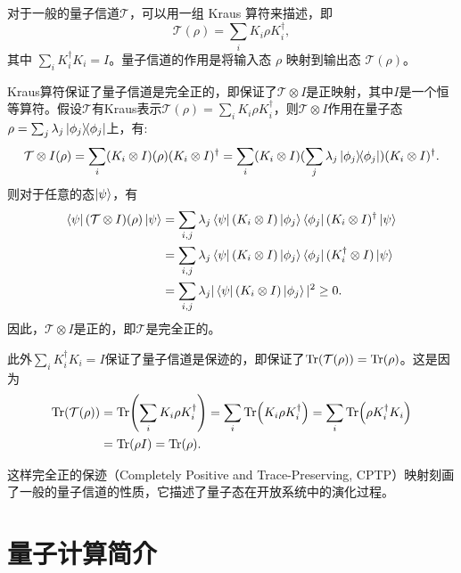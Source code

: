 对于一般的量子信道$\mathcal{T}$，可以用一组 Kraus 算符来描述，即
\begin{equation}
    \mathcal{T}(\rho) = \sum_i K_i \rho K_i^\dagger,
\end{equation}
其中 $\sum_i K_i^\dagger K_i = I$。量子信道的作用是将输入态 $\rho$ 映射到输出态 $\mathcal{T}(\rho)$。

Kraus算符保证了量子信道是完全正的，即保证了$\mathcal{T}\otimes I$是正映射，其中$I$是一个恒等算符。假设$\mathcal{T}$有Kraus表示$\mathcal{T}(\rho) = \sum_i K_i \rho K_i^\dagger$，则$\mathcal{T}\otimes I$作用在量子态$\rho=\sum_j \lambda_j \ketbra{\phi_j}$上，有:
\begin{equation}
        \mathcal{T}\otimes I(\rho) = \sum_i (K_i \otimes I)(\rho)(K_i \otimes I)^\dagger = \sum_i (K_i \otimes I)(\sum_j \lambda_j \ketbra{\phi_j})(K_i \otimes I)^\dagger.
\end{equation}
则对于任意的态$\ket{\psi}$，有
\begin{equation}
    \begin{aligned}
        \bra{\psi}(\mathcal{T}\otimes I)(\rho)\ket{\psi} &= \sum_{i,j} \lambda_j \bra{\psi}(K_i \otimes I)\ket{\phi_j}\bra{\phi_j}(K_i \otimes I)^\dagger\ket{\psi} \\
        &= \sum_{i,j} \lambda_j \bra{\psi}(K_i \otimes I)\ket{\phi_j}\bra{\phi_j}(K_i^\dagger \otimes I)\ket{\psi} \\
        &= \sum_{i,j} \lambda_j |\bra{\psi}(K_i \otimes I)\ket{\phi_j}|^2 \geq 0.
    \end{aligned}
\end{equation}
因此，$\mathcal{T}\otimes I$是正的，即$\mathcal{T}$是完全正的。

此外$\sum_i K_i^\dagger K_i = I$保证了量子信道是保迹的，即保证了$\Tr(\mathcal{T}(\rho)) = \Tr(\rho)$。这是因为
\begin{equation}
    \begin{aligned}
        \Tr(\mathcal{T}(\rho)) &= \Tr(\sum_i K_i \rho K_i^\dagger) = \sum_i \Tr(K_i \rho K_i^\dagger) = \sum_i \Tr(\rho K_i^\dagger K_i) \\
        &= \Tr(\rho I) = \Tr(\rho).
    \end{aligned}
\end{equation}

这样完全正的保迹（Completely Positive and Trace-Preserving, CPTP）映射刻画了一般的量子信道的性质，它描述了量子态在开放系统中的演化过程。


\section{量子计算简介}

